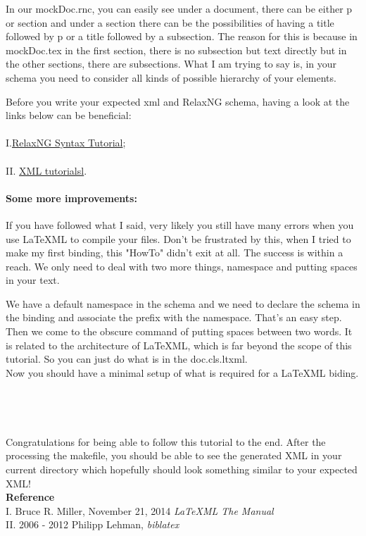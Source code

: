 \documentclass{book}
\begin{document}
In our mockDoc.rnc, you can easily see under a document, there can be either p or section and under a section there can be the possibilities of having a title followed by p or a title followed by a subsection. The reason for this is because in mockDoc.tex in the first section, there is no subsection but text directly but in the other sections, there are subsections. What I am trying to say is, in your schema you need to consider all kinds of possible hierarchy of your elements.

\begin{tcolorbox}
Before you write your expected xml and RelaxNG schema, having a look at the links below can be beneficial: \\ \\
I.\href{http://relaxng.org/compact-tutorial-20030326.html}{RelaxNG Syntax Tutorial}; \\ \\
II. \href{http://www.w3schools.com/xml/}{XML tutorialsl}. 
\end{tcolorbox} 

\paragraph{Some more improvements:} If you have followed what I said, very likely you still have many errors when you use \LaTeX ML to compile your files. Don't be frustrated by this, when I tried to make my first binding, this "HowTo" didn't exit at all. The success is within a reach. We only need to deal with two more things, namespace and putting spaces in your text. 

We have a default namespace in the schema and we need to declare the schema in the binding and associate the prefix with the namespace. That's an easy step. Then we come to the obscure command of putting spaces between two words. It is related to the architecture of \LaTeX ML, which is far beyond the scope of this tutorial. So you can just do what is in the doc.cls.ltxml.\\
 
Now you should have a minimal setup of what is required for a \LaTeX ML biding. \\ \\ \\ \\ \\
Congratulations for being able to follow this tutorial to the end. After the processing the makefile, you should be able to see the generated XML in your current directory which hopefully should look something similar to your expected XML! \\

\textbf{Reference} \\
 I. Bruce R. Miller, November 21, 2014 \emph{\LaTeX ML The Manual} \\
 II. 2006 - 2012 Philipp Lehman, \emph{biblatex}
\end{document}
